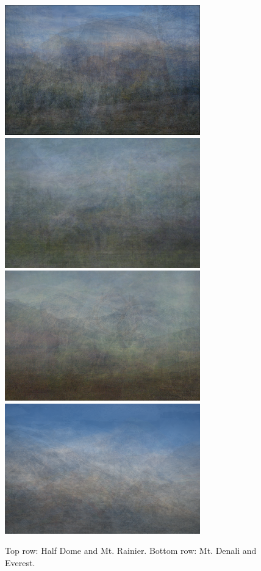 \documentclass[letterpaper,12pt]{article}
\begin{document}
\begin{figure}
	\centering
	\includegraphics[scale=0.4]{../Output/hd-amalgamation.png}
	\includegraphics[scale=0.4]{../Output/rainier-amalgamation.png} \\
	\includegraphics[scale=0.4]{../Output/denali-amalgamation.png}
	\includegraphics[scale=0.4]{../Output/everest-amalgamation.png}
	\caption{Top row: Half Dome and Mt. Rainier. Bottom row: Mt. Denali and Everest.}
\end{figure}
\end{document}
